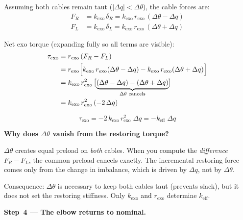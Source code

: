 \documentclass[11pt,a4paper]{article}
\begin{document}
Assuming both cables remain taut ($|\Delta q| < \Delta\theta$), the cable forces are:
\begin{align}
    F_R &= k_{\mathrm{exo}}\,\delta_R = k_{\mathrm{exo}}\,r_{\mathrm{exo}}\,(\Delta\theta - \Delta q)
    \label{eq:FR_disturbed}\\[4pt]
    F_L &= k_{\mathrm{exo}}\,\delta_L = k_{\mathrm{exo}}\,r_{\mathrm{exo}}\,(\Delta\theta + \Delta q)
    \label{eq:FL_disturbed}
\end{align}

Net exo torque (expanding fully so all terms are visible):
\begin{align}
    \tau_{\mathrm{exo}}
      &= r_{\mathrm{exo}}\,(F_R - F_L) \notag\\
      &= r_{\mathrm{exo}}\Bigl[k_{\mathrm{exo}}\,r_{\mathrm{exo}}(\Delta\theta-\Delta q)
                              - k_{\mathrm{exo}}\,r_{\mathrm{exo}}(\Delta\theta+\Delta q)\Bigr]\notag\\
      &= k_{\mathrm{exo}}\,r_{\mathrm{exo}}^{2}\,
         \bigl[\underbrace{(\Delta\theta - \Delta q) - (\Delta\theta + \Delta q)}_{\Delta\theta\text{ cancels}}\bigr]\notag\\
      &= k_{\mathrm{exo}}\,r_{\mathrm{exo}}^{2}\,(-2\,\Delta q)
\end{align}

\begin{equation}
\boxed{\tau_{\mathrm{exo}} = -2\,k_{\mathrm{exo}}\,r_{\mathrm{exo}}^2\;\Delta q
                           = -k_{\mathrm{eff}}\;\Delta q}
\label{eq:restoring}
\end{equation}

\begin{warnbox}
\textbf{Why does $\Delta\theta$ vanish from the restoring torque?}

$\Delta\theta$ creates equal preload on \emph{both} cables.  When you compute
the \emph{difference} $F_R - F_L$, the common preload cancels exactly.  The
incremental restoring force comes only from the change in imbalance, which is
driven by $\Delta q$, not by $\Delta\theta$.

Consequence: $\Delta\theta$ is necessary to keep both cables taut (prevents
slack), but it does not set the restoring stiffness.  Only $k_{\mathrm{exo}}$
and $r_{\mathrm{exo}}$ determine $k_{\mathrm{eff}}$.
\end{warnbox}

\bigskip
\textbf{Step~4 --- The elbow returns to nominal.}
\end{document}
